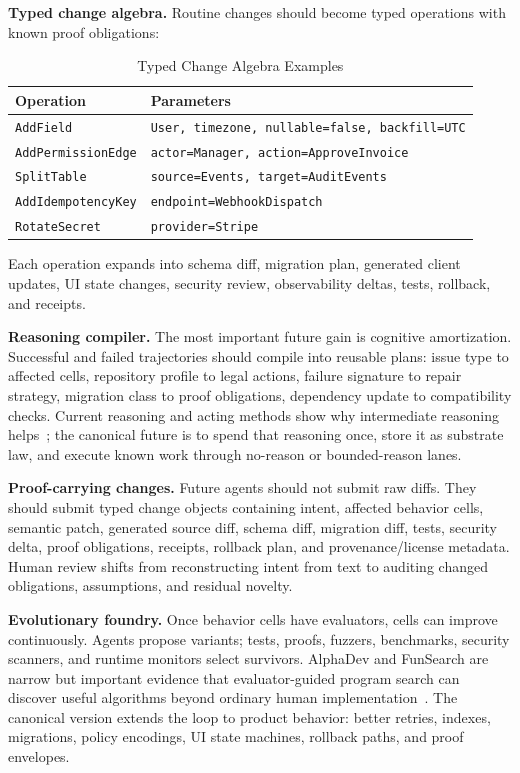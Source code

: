 \textbf{Typed change algebra.} Routine changes should become typed operations with known proof obligations:
\begin{table}[t]
\caption{Typed Change Algebra Examples}
\label{tab:typed-change-algebra}
\centering
\scriptsize
\begin{tabularx}{\columnwidth}{p{}X}
\toprule
Operation & Parameters \\
\midrule
\texttt{AddField} & \texttt{User, timezone, nullable=false, backfill=UTC} \\
\texttt{AddPermissionEdge} & \texttt{actor=Manager, action=ApproveInvoice} \\
\texttt{SplitTable} & \texttt{source=Events, target=AuditEvents} \\
\texttt{AddIdempotencyKey} & \texttt{endpoint=WebhookDispatch} \\
\texttt{RotateSecret} & \texttt{provider=Stripe} \\
\bottomrule
\end{tabularx}
\end{table}
Each operation expands into schema diff, migration plan, generated client updates, UI state changes, security review, observability deltas, tests, rollback, and receipts.

\textbf{Reasoning compiler.} The most important future gain is cognitive amortization. Successful and failed trajectories should compile into reusable plans: issue type to affected cells, repository profile to legal actions, failure signature to repair strategy, migration class to proof obligations, dependency update to compatibility checks. Current reasoning and acting methods show why intermediate reasoning helps~\cite{chainOfThought,selfConsistency,react}; the canonical future is to spend that reasoning once, store it as substrate law, and execute known work through no-reason or bounded-reason lanes.

\textbf{Proof-carrying changes.} Future agents should not submit raw diffs. They should submit typed change objects containing intent, affected behavior cells, semantic patch, generated source diff, schema diff, migration diff, tests, security delta, proof obligations, receipts, rollback plan, and provenance/license metadata. Human review shifts from reconstructing intent from text to auditing changed obligations, assumptions, and residual novelty.

\textbf{Evolutionary foundry.} Once behavior cells have evaluators, cells can improve continuously. Agents propose variants; tests, proofs, fuzzers, benchmarks, security scanners, and runtime monitors select survivors. AlphaDev and FunSearch are narrow but important evidence that evaluator-guided program search can discover useful algorithms beyond ordinary human implementation~\cite{alphadev,funsearch}. The canonical version extends the loop to product behavior: better retries, indexes, migrations, policy encodings, UI state machines, rollback paths, and proof envelopes.

